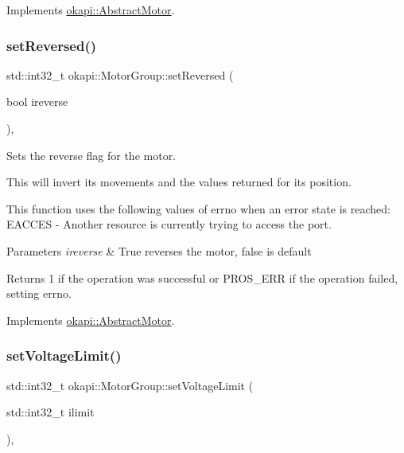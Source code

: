 Implements \mbox{\hyperlink{classokapi_1_1AbstractMotor_aba300f0e323cbdec60f1fee0f3197419}{okapi\+::\+Abstract\+Motor}}.

\mbox{\label{classokapi_1_1MotorGroup_a5655accbdc1b548bc75ec49d40337fe0}} 
\subsubsection{\texorpdfstring{setReversed()}{setReversed()}}
{\footnotesize\ttfamily std\+::int32\+\_\+t okapi\+::\+Motor\+Group\+::set\+Reversed (\begin{DoxyParamCaption}\item[{bool}]{ireverse }\end{DoxyParamCaption})\hspace{0.3cm}{\ttfamily [override]}, {\ttfamily [virtual]}}

Sets the reverse flag for the motor.

This will invert its movements and the values returned for its position.

This function uses the following values of errno when an error state is reached\+: E\+A\+C\+C\+ES -\/ Another resource is currently trying to access the port.


\begin{DoxyParams}{Parameters}
{\em ireverse} & True reverses the motor, false is default \\
\hline
\end{DoxyParams}
\begin{DoxyReturn}{Returns}
1 if the operation was successful or {\ttfamily P\+R\+O\+S\+\_\+\+E\+RR} if the operation failed, setting errno. 
\end{DoxyReturn}


Implements \mbox{\hyperlink{classokapi_1_1AbstractMotor_a72a6a4eb9d237ad57b92401b08ad64fa}{okapi\+::\+Abstract\+Motor}}.

\mbox{\label{classokapi_1_1MotorGroup_a1ccc0bc9af94c6bab28f2373a902b23a}} 
\subsubsection{\texorpdfstring{setVoltageLimit()}{setVoltageLimit()}}
{\footnotesize\ttfamily std\+::int32\+\_\+t okapi\+::\+Motor\+Group\+::set\+Voltage\+Limit (\begin{DoxyParamCaption}\item[{std\+::int32\+\_\+t}]{ilimit }\end{DoxyParamCaption})\hspace{0.3cm}{\ttfamily [override]}, {\ttfamily [virtual]}}

